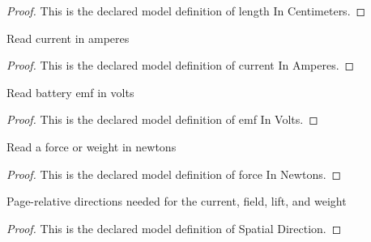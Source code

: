 \begin{proof}
  This is the declared model definition of length In Centimeters.
\end{proof}
\begin{definition}
  \label{def:physics:phyx-mini-0946:phyxminiproblems-problemphyxmini0946-currentinamperes}
  Read current in amperes
\end{definition}
\begin{proof}
  This is the declared model definition of current In Amperes.
\end{proof}
\begin{definition}
  \label{def:physics:phyx-mini-0946:phyxminiproblems-problemphyxmini0946-emfinvolts}
  Read battery emf in volts
\end{definition}
\begin{proof}
  This is the declared model definition of emf In Volts.
\end{proof}
\begin{definition}
  \label{def:physics:phyx-mini-0946:phyxminiproblems-problemphyxmini0946-forceinnewtons}
  Read a force or weight in newtons
\end{definition}
\begin{proof}
  This is the declared model definition of force In Newtons.
\end{proof}
\begin{definition}
  \label{def:physics:phyx-mini-0946:phyxminiproblems-problemphyxmini0946-spatialdirection}
  Page-relative directions needed for the current, field, lift, and weight
\end{definition}
\begin{proof}
  This is the declared model definition of Spatial Direction.
\end{proof}
